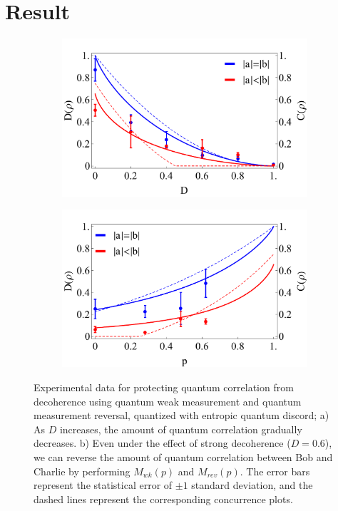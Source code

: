 \documentclass[%
 reprint,
 amsmath,amssymb,
 aps,
]{revtex4-1}
\begin{document}
\section{Result}
\begin{figure}
        \centering
        \begin{subfigure}[b]{0.49\textwidth}
                \includegraphics[width=\textwidth]{DD}
                \caption{}
                \label{fig:DD}
        \end{subfigure}
        \vfill
        \begin{subfigure}[b]{0.49\textwidth}
                \includegraphics[width=\textwidth]{Dp}
                \caption{}
                \label{fig:Dp}
        \end{subfigure}
        \caption{Experimental data for protecting quantum correlation from decoherence using quantum weak measurement and quantum measurement reversal, quantized with entropic quantum discord; a) As $D$ increases, the amount of quantum correlation gradually decreases. b) Even under the effect of strong decoherence ($D=0.6$), we can reverse the amount of quantum correlation between Bob and Charlie by performing $M_{wk}(p)$ and $M_{rev}(p) $. The error bars represent the statistical error of $\pm 1$ standard deviation, and the dashed lines represent the corresponding concurrence plots.}\label{fig:D}
\end{figure}
\end{document}

